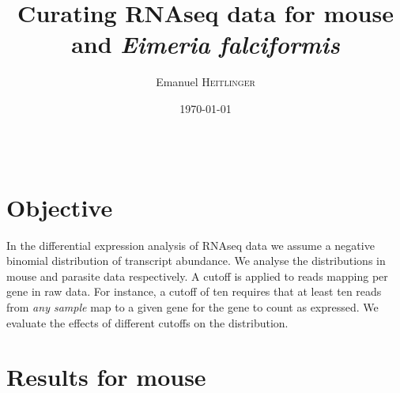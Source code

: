 \documentclass{article}
\title{Curating RNAseq data for mouse and \textit{Eimeria falciformis}} %
\author{Emanuel \textsc{Heitlinger}} %
\date{\today} %
\begin{document}
\maketitle %

\begin{center}
\begin{tabular}{l r}
\end{tabular}
\end{center}



\section{Objective}

In the differential expression analysis of RNAseq data we assume a
negative binomial distribution of transcript abundance. We analyse the
distributions in mouse and parasite data respectively. A cutoff is
applied to reads mapping per gene in raw data. For instance, a cutoff
of ten requires that at least ten reads from \textit{any sample} map
to a given gene for the gene to count as expressed. We evaluate the
effects of different cutoffs on the distribution.



\section{Results for mouse}
\end{document}
